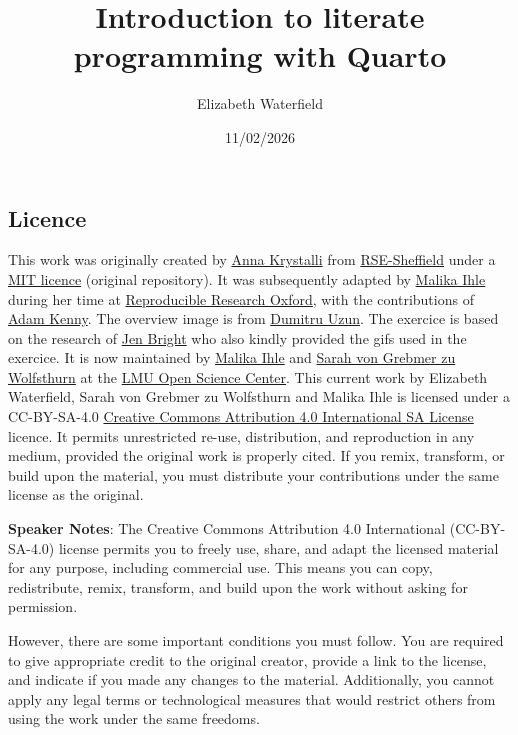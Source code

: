 \documentclass[
  letterpaper,
  DIV=11,
  numbers=noendperiod]{scrartcl}
\title{Introduction to literate programming with Quarto}
\author{Elizabeth Waterfield}
\date{11/02/2026}
\begin{document}
\maketitle


\subsection{Licence}\label{licence}

This work was originally created by
\href{https://github.com/annakrystalli}{Anna Krystalli} from
\href{https://github.com/RSE-Sheffield}{RSE-Sheffield} under a
\href{https://opensource.org/license/mit}{MIT licence} (original
repository). It was subsequently adapted by
\href{https://www.lmu.de/psyedu/de/personen/kontaktseite/malika-ihle-1f381483.html}{Malika
Ihle} during her time at \href{https://ox.ukrn.org/}{Reproducible
Research Oxford}, with the contributions of
\href{https://github.com/Kennyanthro}{Adam Kenny}. The overview image is
from \href{https://duzun.me/tips/git}{Dumitru Uzun}. The exercice is
based on the research of \href{https://x.com/MorphobeakGeek}{Jen Bright}
who also kindly provided the gifs used in the exercice. It is now
maintained by
\href{https://www.lmu.de/psyedu/de/personen/kontaktseite/malika-ihle-1f381483.html}{Malika
Ihle} and
\href{https://orcid.org/my-orcid?orcid=0000-0002-6413-3895}{Sarah von
Grebmer zu Wolfsthurn} at the
\href{https://www.osc.uni-muenchen.de/index.html}{LMU Open Science
Center}. This current work by Elizabeth Waterfield, Sarah von Grebmer zu
Wolfsthurn and Malika Ihle is licensed under a CC-BY-SA-4.0
\href{https://creativecommons.org/licenses/by-sa/4.0/deed.en}{Creative
Commons Attribution 4.0 International SA License} licence. It permits
unrestricted re-use, distribution, and reproduction in any medium,
provided the original work is properly cited. If you remix, transform,
or build upon the material, you must distribute your contributions under
the same license as the original.

\textbf{Speaker Notes}: The Creative Commons Attribution 4.0
International (CC-BY-SA-4.0) license permits you to freely use, share,
and adapt the licensed material for any purpose, including commercial
use. This means you can copy, redistribute, remix, transform, and build
upon the work without asking for permission.

However, there are some important conditions you must follow. You are
required to give appropriate credit to the original creator, provide a
link to the license, and indicate if you made any changes to the
material. Additionally, you cannot apply any legal terms or
technological measures that would restrict others from using the work
under the same freedoms.
\end{document}

